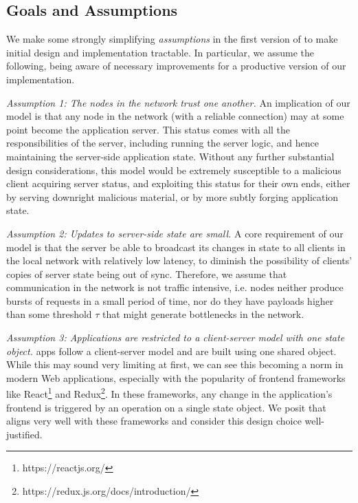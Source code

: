 \subsection{Goals and Assumptions}
\label{sub:approach_goals_and_assumptions}

We make some strongly simplifying \textit{assumptions} in the first version of \APIName to make initial design and implementation tractable. In particular, we assume the following, being aware of necessary improvements for a productive version of our implementation.

\textit{Assumption 1: The nodes in the network trust one another.}
An implication of our model is that any node in the network (with a reliable connection) may at some point become the application server.
This status comes with all the responsibilities of the server, including running the server logic, and hence maintaining the server-side application state.
Without any further substantial design considerations, this model would be extremely susceptible to a malicious client acquiring server status, and exploiting this status for their own ends, either by serving downright malicious material, or by more subtly forging application state.

\textit{Assumption 2: Updates to server-side state are small.}
A core requirement of our model is that the server be able to broadcast its changes in state to all clients in the local network with relatively low latency, to diminish the possibility of clients' copies of server state being out of sync.
Therefore, we assume that communication in the network is not traffic intensive, i.e. nodes neither produce bursts of requests in a small period of time, nor do they have payloads higher than some threshold $\tau$ that might generate bottlenecks in the network.

\textit{Assumption 3: Applications are restricted to a client-server model with one state object.}
\APIshort apps follow a client-server model and are built using one shared object. While this may sound very limiting at first, we can see this becoming a norm in modern Web applications, especially with the popularity of frontend frameworks like React\footnote{https://reactjs.org/} and Redux\footnote{https://redux.js.org/docs/introduction/}. In these frameworks, any change in the application's frontend is triggered by an operation on a single state object. We posit that \APIshort aligns very well with these frameworks and consider this design choice well-justified.